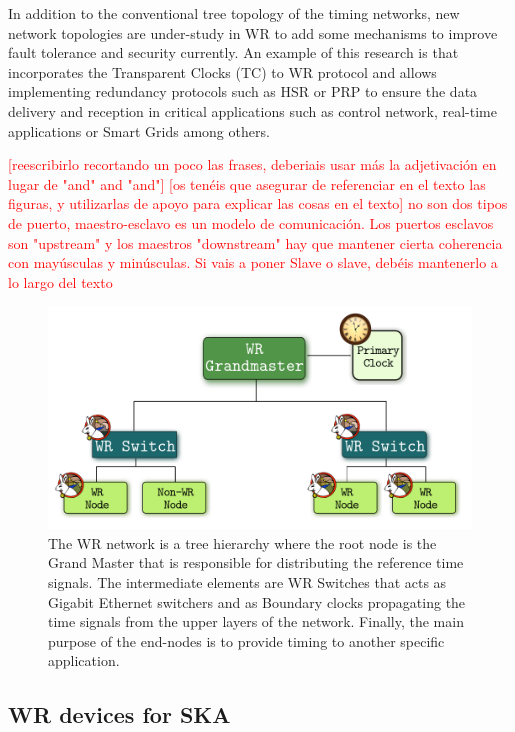 In addition to the conventional tree topology of the timing networks, new network topologies are under-study in WR to add some mechanisms to improve fault tolerance and security currently. An example of this research is \cite{jlgutierrez-paper-redundancy} that incorporates the Transparent Clocks (TC) to WR protocol and allows implementing redundancy protocols such as HSR or PRP to ensure the data delivery and reception in critical applications such as control network, real-time applications or Smart Grids among others.

\textcolor{red}{[reescribirlo recortando un poco las frases, deberiais usar más la adjetivación en lugar de "and" and "and"]}
\textcolor{red}{[os tenéis que asegurar de referenciar en el texto las figuras, y utilizarlas de apoyo para explicar las cosas en el texto]}
\textcolor{red}{no son dos tipos de puerto, maestro-esclavo es un modelo de comunicación. Los puertos esclavos son "upstream" y los maestros "downstream"}
\textcolor{red}{hay que mantener cierta coherencia con mayúsculas y minúsculas. Si vais a poner Slave o slave, debéis mantenerlo a lo largo del texto}

\begin{figure}[H]
	\centering
	\includegraphics[scale=0.4]{img/wr_hierarchy}
	\caption{The WR network is a tree hierarchy where the root node is the Grand Master that is responsible for distributing the reference time signals. The intermediate elements are WR Switches that acts as Gigabit Ethernet switchers and as Boundary clocks propagating the time signals from the upper layers of the network. Finally, the main purpose of the end-nodes is to provide timing to another specific application.}
	\label{fig:wr_hierarchy}
\end{figure}

\subsection{WR devices for SKA} 
\label{subsec:wr-dev}

